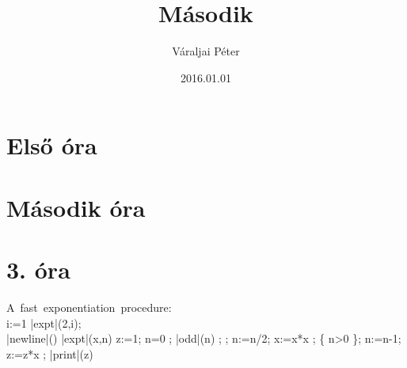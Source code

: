 \documentclass[a4papper, 12pt]{report}
\title{Második}
\author{Váraljai Péter}
\date{2016.01.01}
\begin{document}
	\maketitle
	\tableofcontents
	\chapter{Első óra}
	\chapter{Második óra}
	\chapter{3. óra}
	
	
	\begin{program}
	\mbox{A fast exponentiation procedure:}
	\BEGIN \\ %
  		\FOR i:=1   \DO
     		|expt|(2,i); \\ |newline|() \OD %
			\WHERE
			\PROC |expt|(x,n) \BODY
          		z:=1;
          		\DO \IF n=0 \THEN \EXIT \FI;
             	\DO \IF |odd|(n) \THEN \EXIT \FI;
				;
                n:=n/2; x:=x*x \OD;
            	 \{ n>0 \};
             	n:=n-1; z:=z*x \OD;
         	|print|(z) \ENDPROC
	\END
\end{program}
	
\end{document}
